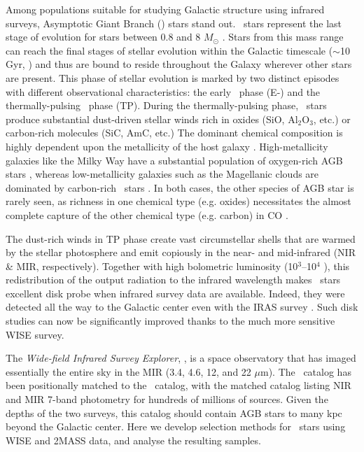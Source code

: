 Among populations suitable for studying Galactic structure using infrared surveys, Asymptotic Giant 
Branch (\agb) stars stand out. \agb\ stars represent the last stage of evolution for stars between 0.8 and 8 $M_\odot$ \citep{1983ARA&A..21..271I, 2005ARA&A..43..435H}. Stars from this mass range can reach the final stages of stellar evolution within the Galactic timescale ($\sim$10 Gyr, \citealt{1983ARA&A..21..271I}) and thus are bound to reside throughout the Galaxy wherever other stars are present. This phase of stellar evolution is marked by two distinct
episodes with different observational characteristics: the early \agb\, phase (E-\agb)  and the thermally-pulsing \agb\, phase (TP). During the thermally-pulsing phase, \agb\, stars produce substantial dust-driven stellar winds \citep[$10^{-7} < \dot{M} < 10^{-4}$ $M_\odot$ yr$^{-1}$,][]{2002A&A...391.1053O} rich in oxides (SiO, Al$_2$O$_3$, etc.) or carbon-rich molecules (SiC, AmC, etc.) The dominant chemical composition is highly dependent upon the metallicity of the host galaxy \citep{2005A&A...434..691M}. High-metallicity galaxies like  the Milky Way have a substantial population of oxygen-rich AGB stars \citep{1985A&A...152L...1H}, whereas low-metallicity galaxies such as the Magellanic clouds are dominated by carbon-rich \agb\ stars \citep{2011AJ....142..103B}. In both cases, the other species of AGB star is rarely seen, as richness in one chemical type (e.g. oxides)  necessitates the almost complete capture of the other chemical type (e.g. carbon) in CO \citep{1983ARA&A..21..271I}. 

The dust-rich winds in TP phase  create vast circumstellar shells that are warmed by the stellar photosphere and emit
copiously in the near- and mid-infrared (NIR \& MIR, respectively). Together with high bolometric luminosity
(10$^3$--10$^4$ \Mo), this redistribution of the output radiation to the infrared wavelength makes \agb\ stars
excellent disk probe when infrared survey data are available. Indeed, they were detected all the way to the 
Galactic center even with the IRAS survey \citep{2002MNRAS.337..749J}. Such disk studies can now be significantly
improved thanks to the much more sensitive WISE survey. 

The \emph{Wide-field Infrared Survey Explorer}, \wise, is a space observatory that has imaged essentially the entire sky in the MIR (3.4, 4.6, 12, and 22 $\mu$m). The \wise\, catalog has been positionally matched to the \twomass\ catalog, with the matched catalog listing NIR and MIR 7-band photometry for
hundreds of millions of sources. Given the depths of the two surveys, this catalog should contain AGB stars to many
kpc beyond the Galactic center. Here we develop selection methods for \agb\ stars using WISE and 2MASS data,
and analyse the resulting samples. 

